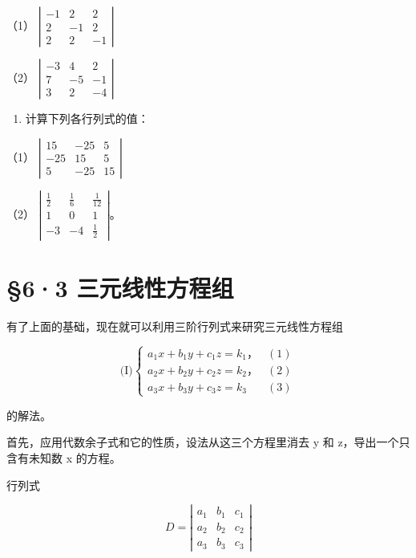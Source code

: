 （1）
\(\left| \begin{array}{ccc} - 1 & 2 & 2\\ 2 & -1 & 2\\ 2 & 2 & -1 \end{array} \right|\)

（2）
\(\left| \begin{array}{ccc} - 3 & 4 & 2\\ 7 & -5 & -1\\ 3 & 2 & -4 \end{array} \right|\)

\begin{enumerate}[start=4]
\item
  计算下列各行列式的值：
\end{enumerate}

（1）
\(\left| \begin{array}{ccc}15 & -25 & 5\\ -25 & 15 & 5\\ 5 & -25 & 15 \end{array} \right|\)

（2）
\(\left| \begin{array}{ccc} \frac{1}{2} & \frac{1}{6} & \frac{1}{12} \\ 1 & 0 & 1 \\ -3 & -4 & \frac{1}{2} \end{array} \right|\)。

\section{§6·3 三元线性方程组}

有了上面的基础，现在就可以利用三阶行列式来研究三元线性方程组

\[
\text {(I)} \left\{ \begin{array}{ll} a _ {1} x + b _ {1} y + c _ {1} z = k _ {1}\text{，} & (1) \\ a _ {2} x + b _ {2} y + c _ {2} z = k _ {2}\text{，} & (2) \\ a _ {3} x + b _ {3} y + c _ {3} z = k _ {3} & (3) \end{array} \right.
\]

的解法。

首先，应用代数余子式和它的性质，设法从这三个方程里消去 y 和
z，导出一个只含有未知数 x 的方程。

行列式

\[
D = \left| \begin{array}{ccc} a _ {1} & b _ {1} & c _ {1} \\ a _ {2} & b _ {2} & c _ {2} \\ a _ {3} & b _ {3} & c _ {3} \end{array} \right|
\]

